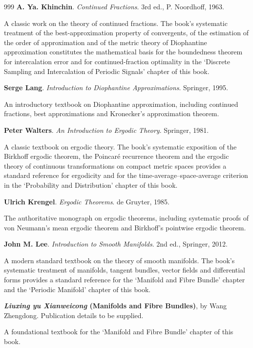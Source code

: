 \begin{thebibliography}{999}
 \textbf{A. Ya. Khinchin}. \textit{Continued Fractions}. 3rd ed., P. Noordhoff, 1963.

A classic work on the theory of continued fractions. The book's systematic treatment of the best-approximation property of convergents, of the estimation of the order of approximation and of the metric theory of Diophantine approximation constitutes the mathematical basis for the boundedness theorem for intercalation error and for continued-fraction optimality in the `Discrete Sampling and Intercalation of Periodic Signals' chapter of this book.

 \textbf{Serge Lang}. \textit{Introduction to Diophantine Approximations}. Springer, 1995.

An introductory textbook on Diophantine approximation, including continued fractions, best approximations and Kronecker's approximation theorem.

 \textbf{Peter Walters}. \textit{An Introduction to Ergodic Theory}. Springer, 1981.

A classic textbook on ergodic theory. The book's systematic exposition of the Birkhoff ergodic theorem, the Poincar\'e recurrence theorem and the ergodic theory of continuous transformations on compact metric spaces provides a standard reference for ergodicity and for the time-average--space-average criterion in the `Probability and Distribution' chapter of this book.

 \textbf{Ulrich Krengel}. \textit{Ergodic Theorems}. de Gruyter, 1985.

The authoritative monograph on ergodic theorems, including systematic proofs of von Neumann's mean ergodic theorem and Birkhoff's pointwise ergodic theorem.

 \textbf{John M. Lee}. \textit{Introduction to Smooth Manifolds}. 2nd ed., Springer, 2012.

A modern standard textbook on the theory of smooth manifolds. The book's systematic treatment of manifolds, tangent bundles, vector fields and differential forms provides a standard reference for the `Manifold and Fibre Bundle' chapter and the `Periodic Manifold' chapter of this book.

 \textbf{\textit{Liuxing yu Xianweicong} (Manifolds and Fibre Bundles)}, by Wang Zhengdong. Publication details to be supplied.

A foundational textbook for the `Manifold and Fibre Bundle' chapter of this book.


\end{thebibliography}
